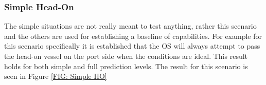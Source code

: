 
\clearpage
\subsubsection{Simple Head-On}
The simple situations are not really meant to test anything, rather this scenario and the others are used for establishing
a baseline of capabilities. For example for this scenario specifically it is established that the OS will always attempt to
pass the head-on vessel on the port side when the conditions are ideal. This result holds for both simple and
full prediction levels. The result for this scenario is seen in Figure \ref{FIG: Simple HO}

